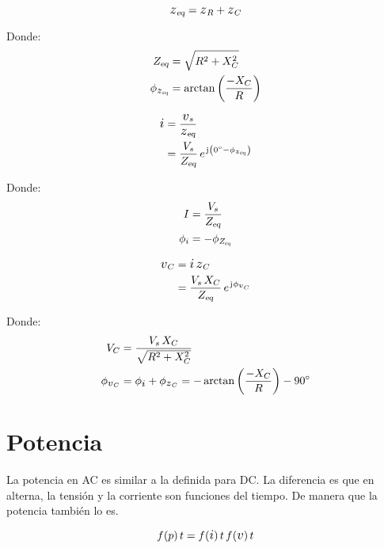 \begin{equation*}
    \sub{\impedance}{eq} = \impedance_R + \impedance_C
\end{equation*}

Donde:
\begin{align*}
    \sub{Z}{eq} &= \sqrt{R^2 + X_C^2}
    \\
    \phi_{\sub{\impedance}{eq}} &= \arctan{\inParentheses{\dfrac{-X_C}{R}}}
\end{align*}

\begin{align*}
    \current &= \frac{\voltage_s}{\sub{\impedance}{eq}}
    \\
    &= \frac{V_s}{\sub{Z}{eq}} \, e^{\iu \inParentheses{\ang{0} - \phi_{\sub{\impedance}{eq}}}}
\end{align*}

Donde:
\begin{align*}
    I &= \frac{V_s}{{{Z}_\textsl{{eq}}}}
    \\
    \phi_i &= - \phi_{{{Z}_\textsl{{eq}}}}
\end{align*}

\begin{align*}
    \voltage_C &= \current \, \impedance_C
    \\
    &= \frac{V_s \, X_C}{\sub{Z}{eq}} \, e^{\iu \phi_{\voltage_C}}
\end{align*}

Donde:
\begin{align*}
    V_C &= \frac{V_s \, X_C}{\sqrt{R^2 + X_C^2}}
    \\
    \phi_{\voltage_C} &= \phi_\current + \phi_{\impedance_C} = - \arctan{\inParentheses{\dfrac{-X_C}{R} }} - \ang{90}
\end{align*}


\section{Potencia}

La potencia en AC es similar a la definida para DC.
La diferencia es que en alterna, la tensión y la corriente son funciones del tiempo.
De manera que la potencia también lo es.

\begin{mdframed}[style=DefinitionFrame]
    \begin{defn}
    \end{defn}
    \begin{equation*}
        \fx{p}{t} = \fx{\current}{t} \, \fx{\voltage}{t}
    \end{equation*}
\end{mdframed}

